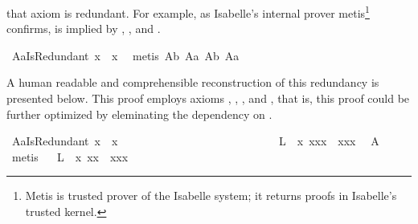 \begin{isabellebody}
\begin{isamarkuptext}
that axiom  is redundant. For example, as Isabelle's internal prover 
metis\footnote{Metis is trusted prover of the Isabelle system; it returns proofs in Isabelle's 
trusted kernel.} confirms,  is implied by , ,  
and .%
\end{isamarkuptext}%
\isamarkuptrue%
\isamarkupfalse%
\ A{}aIsRedundant{\isacharunderscore}{}{\isacharcolon}\ {\isachardoublequoteopen}{\isacharparenleft}{\isasymbox}x{\isacharparenright}{\isasymbox}\ {\isasymapprox}\ {\isasymbox}x{\isachardoublequoteclose}\ \isanewline
%
\isadelimproof
%
\endisadelimproof
%
\isatagproof
{}\isamarkupfalse%
\ {\isacharparenleft}metis\ A{}b\ A{}a\ A{}b\ A{}a{\isacharparenright}%
\endisatagproof
{\isafoldproof}%
%
\isadelimproof
%
\endisadelimproof
%
\begin{isamarkuptext}%
A human readable and comprehensible reconstruction of this redundancy is 
presented below. This proof employs axioms , , , 
 and , that is, this proof could be further optimized by eleminating 
the dependency on .%
\end{isamarkuptext}%
\isamarkuptrue%
\isamarkupfalse%
\ A{}aIsRedundant{\isacharunderscore}{}{\isacharcolon}\ {\isachardoublequoteopen}{\isacharparenleft}{\isasymbox}x{\isacharparenright}{\isasymbox}\ {\isasymapprox}\ {\isasymbox}x{\isachardoublequoteclose}\ \isanewline
%
\isadelimproof
\ %
\endisadelimproof
%
\isatagproof
{}\isamarkupfalse%
\ {\isacharminus}\ \ \ \ \ \ \ \ \ \ \ \ \ \ \ \ \ \ \ \ \isanewline
\ \isamarkupfalse%
\ \ L{}{\isacharcolon}\ \ {\isachardoublequoteopen}{\isasymforall}x{\isachardot}\ {\isacharparenleft}{\isasymbox}{\isasymbox}x{\isacharparenright}{\isasymcdot}{\isacharparenleft}{\isacharparenleft}{\isasymbox}x{\isacharparenright}{\isasymcdot}x{\isacharparenright}\ {\isasymapprox}\ {\isacharparenleft}{\isacharparenleft}{\isasymbox}{\isasymbox}x{\isacharparenright}{\isasymcdot}{\isacharparenleft}{\isasymbox}x{\isacharparenright}{\isacharparenright}{\isasymcdot}x{\isachardoublequoteclose}\ \isamarkupfalse%
\ A{}\ \isamarkupfalse%
\ metis\isanewline
\ \isamarkupfalse%
\ L{}{\isacharcolon}\ \ {\isachardoublequoteopen}{\isasymforall}x{\isachardot}\ {\isacharparenleft}{\isasymbox}{\isasymbox}x{\isacharparenright}{\isasymcdot}x\ {\isasymapprox}\ {\isacharparenleft}{\isacharparenleft}{\isasymbox}{\isasymbox}x{\isacharparenright}{\isasymcdot}{\isacharparenleft}{\isasymbox}x{\isacharparenright}{\isacharparenright}{\isasymcdot}x{\isachardoublequoteclose}\ \ \ \ \ \ \ \ \isamarkupfalse%

\end{isabellebody}
